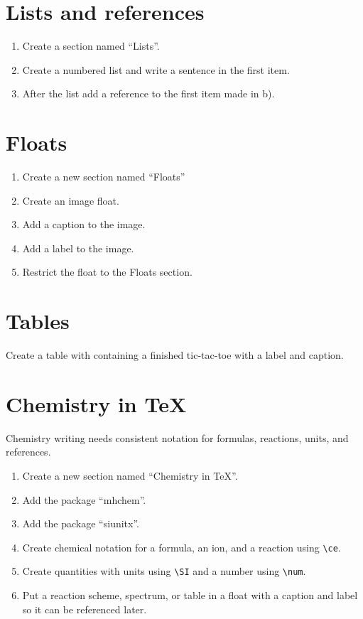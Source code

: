 \documentclass{article}
\begin{document}
\newpage

\section{Lists and references}
\begin{enumerate}[label=\alph*)]
  \item Create a section named ``Lists''.
  \item Create a numbered list and write a sentence in the first item.
  \item After the list add a reference to the first item made in b).
\end{enumerate}

\section{Floats}
\begin{enumerate}[label=\alph*)]
  \item Create a new section named ``Floats''
  \item Create an image float.
  \item Add a caption to the image.
  \item Add a label to the image.
  \item Restrict the float to the Floats section.
\end{enumerate}

\section{Tables}
Create a table with containing a finished tic-tac-toe with a label and caption.

\section{Chemistry in TeX}
Chemistry writing needs consistent notation for formulas, reactions, units, and references.

\begin{enumerate}[label=\alph*)]
  \item Create a new section named ``Chemistry in TeX''.
  \item Add the package ``mhchem''.
  \item Add the package ``siunitx''.
  \item Create chemical notation for a formula, an ion, and a reaction using \verb|\ce|.
  \item Create quantities with units using \verb|\SI| and a number using \verb|\num|.
  \item Put a reaction scheme, spectrum, or table in a float with a caption and label so it can be referenced later.
\end{enumerate}
\end{document}
